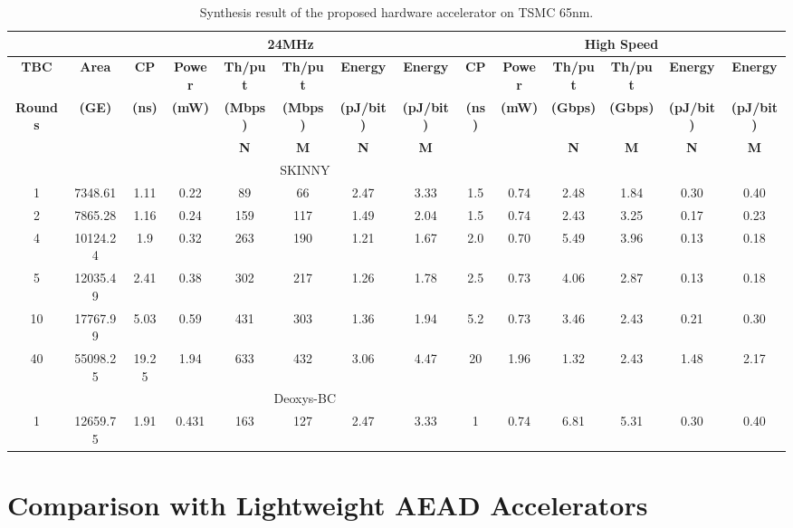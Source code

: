 \documentclass[conference]{IEEEtran}
\begin{document}
\begin{table}
  \centering
  \caption{Synthesis result of the proposed hardware accelerator on TSMC 65nm.}\label{tab:acc65nm}
  \begin{tabular}{c|c|c|c|c|c|c|c|c|c|c|c|c|c}\hline
    \multicolumn{2}{c|}{}&\multicolumn{6}{c|}{\textbf{24MHz}}&\multicolumn{6}{c}{\textbf{High Speed}} \\ \hline
    \textbf{TBC} & \textbf{Area} & \textbf{CP} & \textbf{Power} & \textbf{Th/put} &  \textbf{Th/put} & \textbf{Energy} & \textbf{Energy} & \textbf{CP} & \textbf{Power} & \textbf{Th/put} &  \textbf{Th/put} & \textbf{Energy} & \textbf{Energy}  \\ 
    \textbf{Rounds} & \textbf{(GE)} & \textbf{(ns)} & \textbf{(mW)} & \textbf{(Mbps)} & \textbf{(Mbps)} & \textbf{(pJ/bit)} &  \textbf{(pJ/bit)}  & \textbf{(ns)}& \textbf{(mW)} & \textbf{(Gbps)} & \textbf{(Gbps)} & \textbf{(pJ/bit)} &  \textbf{(pJ/bit)}   \\
    & & &  & \textbf{N} & \textbf{M} &\textbf{N} & \textbf{M}  && & \textbf{N} & \textbf{M} & \textbf{N} & \textbf{M}  \\ \hline \hline
    \multicolumn{11}{c}{SKINNY} \\ \hline
    1  & 7348.61   & 1.11	  & 0.22    &  89 &  66 & 2.47	& 3.33 & 1.5 & 0.74 & 2.48 & 1.84 & 0.30 & 0.40 \\ 
    2	 & 7865.28	 & 1.16		& 0.24		& 159 & 117 & 1.49  & 2.04 & 1.5 & 0.74 & 2.43 & 3.25 & 0.17 & 0.23 \\ 
		4	 & 10124.24	 & 1.9		& 0.32		& 263 & 190 & 1.21  & 1.67 & 2.0 & 0.70 & 5.49 & 3.96 & 0.13 & 0.18 \\
    5	 & 12035.49	 & 2.41		& 0.38		& 302 & 217 & 1.26  & 1.78 & 2.5 & 0.73 & 4.06 & 2.87 & 0.13 & 0.18 \\ 
		10 & 17767.99	 & 5.03		& 0.59		& 431 & 303 & 1.36  & 1.94 & 5.2 & 0.73 & 3.46 & 2.43 & 0.21 & 0.30 \\ 
		40 & 55098.25	 & 19.25	& 1.94		& 633 & 432 & 3.06  & 4.47 & 20  & 1.96 & 1.32 & 2.43 & 1.48 & 2.17 \\ \hline\hline
    \multicolumn{11}{c}{Deoxys-BC} \\ \hline
    1  & 12659.75  & 1.91	  & 0.431   & 163 & 127 & 2.47	& 3.33 & 1   & 0.74 & 6.81 & 5.31 & 0.30 & 0.40  \\ \hline
  \end{tabular}
\end{table}

\section{Comparison with Lightweight AEAD Accelerators}
\end{document}
